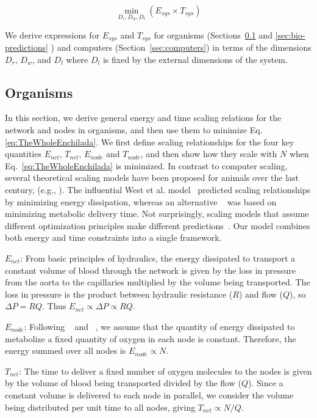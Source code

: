 \documentclass[12pt]{article}
\begin{document}
\begin{equation}
  \min_{D_r,D_w,D_l}(E_{sys} \times T_{sys})
\label{eq:TheWholeEnchilada}
\end{equation}

\noindent We derive expressions for $E_{sys}$ and $T_{sys}$ for organisms
(Sections~\ref{sec:organisms} and \ref{sec:bio-predictions} ) and computers (Section~\ref{sec:computers}) in terms of
the dimensions $D_r$, $D_w$, and $D_l$ where $D_l$ is fixed by the external
dimensions of the system.


\subsection{Organisms}
\label{sec:organisms}

In this section, we derive general energy and time scaling relations for the
network and nodes in organisms, and then use them to minimize Eq.
\ref{eq:TheWholeEnchilada}.  We first define scaling relationships for the four
key quantities $E_{net}$, $T_{net}$, $E_{node}$ and $T_{node}$, and
then show
how they scale with $N$ when Eq.~\ref{eq:TheWholeEnchilada} is minimized.
In contrast to computer scaling, several theoretical scaling models have been proposed for animals over the last century, (e.g., \cite{thompson1942arcy, west97, banavar1999size, dodds2010optimal, banavar10}). The influential West et al. model~\cite{west97} predicted
scaling relationships by minimizing energy dissipation,
whereas an alternative ~\cite{banavar10} was based on minimizing metabolic delivery time. Not surprisingly, scaling models that assume different optimization principles make different predictions~\cite{newberry2015testing}.  Our model
combines both energy and time constraints into a single framework.

$E_{net}$: From basic principles of hydraulics, the energy dissipated to
transport a constant volume of blood through the network is given by the loss
in pressure from the aorta to the capillaries multiplied by the volume being
transported.  The loss in pressure is the product between hydraulic resistance ($R$) and
flow ($Q$), so $\Delta P = RQ$.  Thus $E_{net} \propto
\Delta P \propto RQ$. 

$E_{node}$: Following ~\cite{west97} and ~\cite{moses08}, we assume that the
quantity of energy dissipated to metabolize a fixed quantity of oxygen in each
node is constant.  Therefore, the energy summed over all nodes is $E_{node} \propto
N$.

$T_{net}$: The time to deliver a fixed number of oxygen molecules to the nodes
is given by the volume of blood being transported divided by the flow ($Q$).
Since a constant volume is delivered to each node in parallel, we consider the
volume being distributed per unit time to all nodes, giving $T_{net}\propto
N/Q$.  
\end{document}
